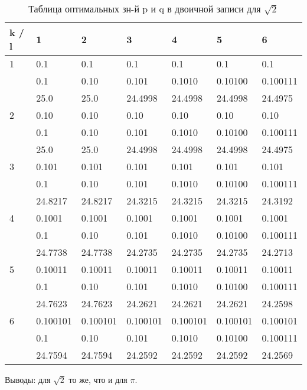 \documentclass[12pt]{article}
\begin{document}
	\begin{table}[h]
		\caption{Таблица оптимальных зн-й p и q в двоичной записи для $\sqrt{2}$}
		\label{sometable}
		\begin{center}
			\begin{tabular}{|l|l|l|l|l|l|l|}
				\hline
				k / l &1 & 2 & 3 & 4 & 5 & 6\\
				\hline
				1 & 0.1& 0.1& 0.1& 0.1& 0.1& 0.1\\
				& 0.1& 0.10& 0.101& 0.1010& 0.10100& 0.100111\\
				& 25.0& 25.0& 24.4998& 24.4998& 24.4998& 24.4975\\
				\hline
				2 & 0.10& 0.10& 0.10& 0.10& 0.10& 0.10\\
				& 0.1& 0.10& 0.101& 0.1010& 0.10100& 0.100111\\
				& 25.0& 25.0& 24.4998& 24.4998& 24.4998& 24.4975\\
				\hline
				3 & 0.101& 0.101& 0.101& 0.101& 0.101& 0.101\\
				& 0.1& 0.10& 0.101& 0.1010& 0.10100& 0.100111\\
				& 24.8217& 24.8217& 24.3215& 24.3215& 24.3215& 24.3192\\
				\hline
				4 & 0.1001& 0.1001& 0.1001& 0.1001& 0.1001& 0.1001\\
				& 0.1& 0.10& 0.101& 0.1010& 0.10100& 0.100111\\
				& 24.7738& 24.7738& 24.2735& 24.2735& 24.2735& 24.2713\\
				\hline
				5 & 0.10011& 0.10011& 0.10011& 0.10011& 0.10011& 0.10011\\
				& 0.1& 0.10& 0.101& 0.1010& 0.10100& 0.100111\\
				& 24.7623& 24.7623& 24.2621& 24.2621& 24.2621& 24.2598\\
				\hline
				6 & 0.100101& 0.100101& 0.100101& 0.100101& 0.100101& 0.100101\\
				& 0.1& 0.10& 0.101& 0.1010& 0.10100& 0.100111\\
				& 24.7594& 24.7594& 24.2592& 24.2592& 24.2592& 24.2569\\
				\hline
			\end{tabular}
		\end{center}
	\end{table}
	
	Выводы: для $\sqrt{2}$ то же, что и для $\pi$.
	
\end{document}
